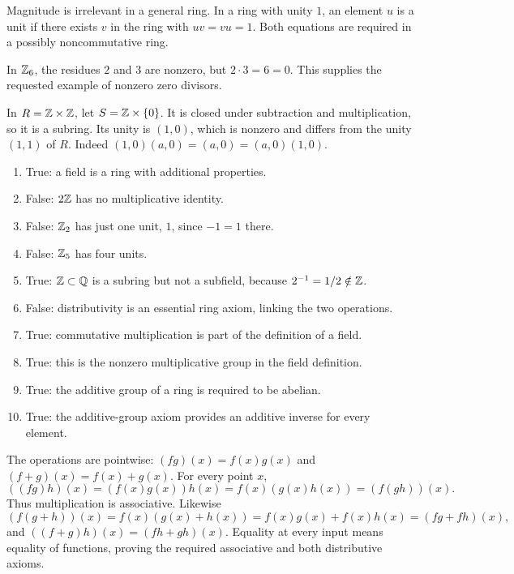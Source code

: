 Magnitude is irrelevant in a general ring. In a ring with unity $1$, an element $u$ is a unit if there exists $v$ in the ring with $uv=vu=1$. Both equations are required in a possibly noncommutative ring.

In $\mathbb{Z}_6$, the residues $2$ and $3$ are nonzero, but $2\cdot3=6=0$. This supplies the requested example of nonzero zero divisors.

In $R=\mathbb{Z}\times\mathbb{Z}$, let $S=\mathbb{Z}\times\{0\}$. It is closed under subtraction and multiplication, so it is a subring. Its unity is $(1,0)$, which is nonzero and differs from the unity $(1,1)$ of $R$. Indeed $(1,0)(a,0)=(a,0)=(a,0)(1,0)$.

\begin{enumerate}[label=(\alph*)]
\item True: a field is a ring with additional properties.
\item False: $2\mathbb{Z}$ has no multiplicative identity.
\item False: $\mathbb{Z}_2$ has just one unit, $1$, since $-1=1$ there.
\item False: $\mathbb{Z}_5$ has four units.
\item True: $\mathbb{Z}\subset\mathbb{Q}$ is a subring but not a subfield, because $2^{-1}=1/2\notin\mathbb{Z}$.
\item False: distributivity is an essential ring axiom, linking the two operations.
\item True: commutative multiplication is part of the definition of a field.
\item True: this is the nonzero multiplicative group in the field definition.
\item True: the additive group of a ring is required to be abelian.
\item True: the additive-group axiom provides an additive inverse for every element.
\end{enumerate}

The operations are pointwise: $(fg)(x)=f(x)g(x)$ and $(f+g)(x)=f(x)+g(x)$. For every point $x$,
\[((fg)h)(x)=(f(x)g(x))h(x)=f(x)(g(x)h(x))=(f(gh))(x).
\]
Thus multiplication is associative. Likewise
\[(f(g+h))(x)=f(x)(g(x)+h(x))=f(x)g(x)+f(x)h(x)=(fg+fh)(x),
\]
and $((f+g)h)(x)=(fh+gh)(x)$. Equality at every input means equality of functions, proving the required associative and both distributive axioms.


